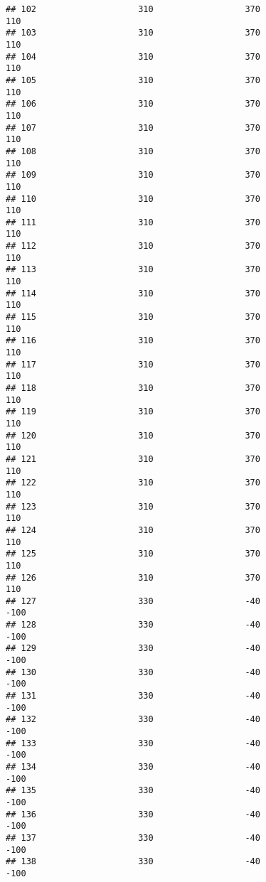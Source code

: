 \documentclass[]{article}
\begin{document}
\begin{verbatim}
## 102                    310                  370                  110
## 103                    310                  370                  110
## 104                    310                  370                  110
## 105                    310                  370                  110
## 106                    310                  370                  110
## 107                    310                  370                  110
## 108                    310                  370                  110
## 109                    310                  370                  110
## 110                    310                  370                  110
## 111                    310                  370                  110
## 112                    310                  370                  110
## 113                    310                  370                  110
## 114                    310                  370                  110
## 115                    310                  370                  110
## 116                    310                  370                  110
## 117                    310                  370                  110
## 118                    310                  370                  110
## 119                    310                  370                  110
## 120                    310                  370                  110
## 121                    310                  370                  110
## 122                    310                  370                  110
## 123                    310                  370                  110
## 124                    310                  370                  110
## 125                    310                  370                  110
## 126                    310                  370                  110
## 127                    330                  -40                 -100
## 128                    330                  -40                 -100
## 129                    330                  -40                 -100
## 130                    330                  -40                 -100
## 131                    330                  -40                 -100
## 132                    330                  -40                 -100
## 133                    330                  -40                 -100
## 134                    330                  -40                 -100
## 135                    330                  -40                 -100
## 136                    330                  -40                 -100
## 137                    330                  -40                 -100
## 138                    330                  -40                 -100

\end{verbatim}
\end{document}
